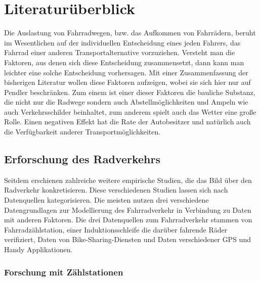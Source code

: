 \documentclass[a4paper,12pt]{thesis}
\begin{document}
\chapter{Literaturüberblick}

Die Auslastung von Fahrradwegen, bzw. das Aufkommen von Fahrrädern, beruht im Wesentlichen auf der individuellen Entscheidung eines jeden Fahrers, das Fahrrad einer anderen Transportalternative vorzuziehen. Versteht man die Faktoren, aus denen sich diese Entscheidung zusammensetzt, dann kann man leichter eine solche Entscheidung vorhersagen. Mit einer Zusammenfassung der bisherigen Literatur wollen \cite{Heinen2010} diese Faktoren aufzeigen, wobei sie sich hier nur auf Pendler beschränken. Zum einem ist einer dieser Faktoren die bauliche Substanz, die nicht nur die Radwege sondern auch Abstellmöglichkeiten und Ampeln wie auch Verkehrsschilder beinhaltet, zum anderem spielt auch das Wetter eine große Rolle. Einen negativen Effekt hat die Rate der Autobesitzer und natürlich auch die Verfügbarkeit anderer Transportmöglichkeiten.\\

\section{Erforschung des Radverkehrs}

Seitdem erschienen zahlreiche weitere empirische Studien, die das Bild über den Radverkehr konkretisieren. Diese verschiedenen Studien lassen sich nach Datenquellen kategorisieren. Die meisten nutzen drei verschiedene Datengrundlagen zur Modellierung des Fahrradverkehr in Verbindung zu Daten mit anderen Faktoren. Die drei Datenquellen zum Fahrradverkehr stammen von Fahrradzählstation, einer Induktionsschleife die darüber fahrende Räder verifiziert, Daten von Bike-Sharing-Diensten und Daten verschiedener GPS und Handy Applikationen.\\

\subsection{Forschung mit Zählstationen}
\end{document}
